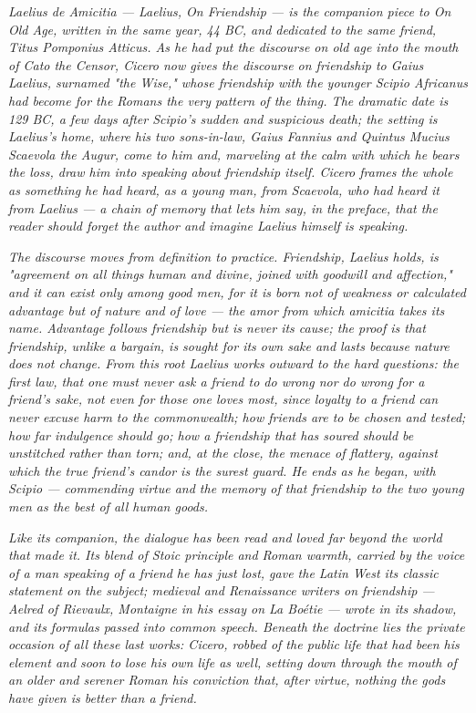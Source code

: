 
\textit{\textit{Laelius de Amicitia} --- Laelius, On Friendship --- is
the companion piece to \textit{On Old Age}, written in the same year,
44 BC, and dedicated to the same friend, Titus Pomponius Atticus. As he
had put the discourse on old age into the mouth of Cato the Censor,
Cicero now gives the discourse on friendship to Gaius Laelius, surnamed
"the Wise," whose friendship with the younger Scipio Africanus had
become for the Romans the very pattern of the thing. The dramatic date
is 129 BC, a few days after Scipio's sudden and suspicious death; the
setting is Laelius's home, where his two sons-in-law, Gaius Fannius and
Quintus Mucius Scaevola the Augur, come to him and, marveling at the
calm with which he bears the loss, draw him into speaking about
friendship itself. Cicero frames the whole as something he had heard,
as a young man, from Scaevola, who had heard it from Laelius --- a chain
of memory that lets him say, in the preface, that the reader should
forget the author and imagine Laelius himself is speaking.}

\textit{The discourse moves from definition to practice. Friendship,
Laelius holds, is "agreement on all things human and divine, joined
with goodwill and affection," and it can exist only among good men, for
it is born not of weakness or calculated advantage but of nature and of
love --- the \textit{amor} from which \textit{amicitia} takes its name.
Advantage follows friendship but is never its cause; the proof is that
friendship, unlike a bargain, is sought for its own sake and lasts
because nature does not change. From this root Laelius works outward to
the hard questions: the first law, that one must never ask a friend to
do wrong nor do wrong for a friend's sake, not even for those one loves
most, since loyalty to a friend can never excuse harm to the
commonwealth; how friends are to be chosen and tested; how far
indulgence should go; how a friendship that has soured should be
unstitched rather than torn; and, at the close, the menace of flattery,
against which the true friend's candor is the surest guard. He ends as
he began, with Scipio --- commending virtue and the memory of that
friendship to the two young men as the best of all human goods.}

\textit{Like its companion, the dialogue has been read and loved far
beyond the world that made it. Its blend of Stoic principle and Roman
warmth, carried by the voice of a man speaking of a friend he has just
lost, gave the Latin West its classic statement on the subject;
medieval and Renaissance writers on friendship --- Aelred of Rievaulx,
Montaigne in his essay on La Boétie --- wrote in its shadow, and its
formulas passed into common speech. Beneath the doctrine lies the
private occasion of all these last works: Cicero, robbed of the public
life that had been his element and soon to lose his own life as well,
setting down through the mouth of an older and serener Roman his
conviction that, after virtue, nothing the gods have given is better
than a friend.}
